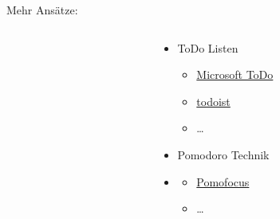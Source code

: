 \documentclass[aspectratio=169,shownotes]{beamer}
\begin{document}
\begin{frame}{Mehr Ansätze:}
\begin{columns}[t]
\begin{column}{0.3\textwidth}
        \end{column}
        \begin{column}{0.7\textwidth}
            \begin{itemize}
                \item ToDo Listen
                \begin{itemize}
                    \item \href{https://to-do.office.com/tasks/}{Microsoft ToDo}
                    \item \href{https://todoist.com/de}{todoist}
                    \item \dots
                \end{itemize}
                \item Pomodoro Technik
                \item \begin{itemize}
                    \item \href{https://pomofocus.io/}{Pomofocus}
                    \item \dots
                \end{itemize}                 
            \end{itemize}
        \end{column}
    \end{columns}
\end{frame}
\end{document}
